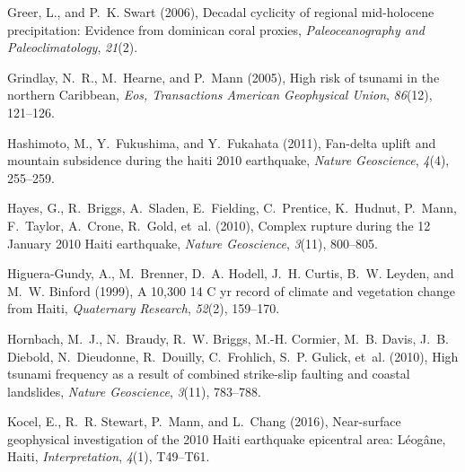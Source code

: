 \documentclass[linenumbers,draft]{agujournal}
\begin{document}
\begin{thebibliography}{62}
Greer, L., and P.~K. Swart (2006), Decadal cyclicity of regional mid-holocene
  precipitation: Evidence from dominican coral proxies,
  \textit{Paleoceanography and Paleoclimatology}, \textit{21}(2).

Grindlay, N.~R., M.~Hearne, and P.~Mann (2005), {High risk of tsunami in the
  northern Caribbean}, \textit{Eos, Transactions American Geophysical Union},
  \textit{86}(12), 121--126.

Hashimoto, M., Y.~Fukushima, and Y.~Fukahata (2011), Fan-delta uplift and
  mountain subsidence during the haiti 2010 earthquake, \textit{Nature
  Geoscience}, \textit{4}(4), 255--259.

Hayes, G., R.~Briggs, A.~Sladen, E.~Fielding, C.~Prentice, K.~Hudnut, P.~Mann,
  F.~Taylor, A.~Crone, R.~Gold, et~al. (2010), Complex rupture during the 12
  {January 2010 Haiti} earthquake, \textit{Nature Geoscience}, \textit{3}(11),
  800--805.

Higuera-Gundy, A., M.~Brenner, D.~A. Hodell, J.~H. Curtis, B.~W. Leyden, and
  M.~W. Binford (1999), A 10,300 14 {C yr record of climate and vegetation
  change from Haiti}, \textit{Quaternary Research}, \textit{52}(2), 159--170.

Hornbach, M.~J., N.~Braudy, R.~W. Briggs, M.-H. Cormier, M.~B. Davis, J.~B.
  Diebold, N.~Dieudonne, R.~Douilly, C.~Frohlich, S.~P. Gulick, et~al. (2010),
  High tsunami frequency as a result of combined strike-slip faulting and
  coastal landslides, \textit{Nature Geoscience}, \textit{3}(11), 783--788.

Kocel, E., R.~R. Stewart, P.~Mann, and L.~Chang (2016), {Near-surface
  geophysical investigation of the 2010 Haiti earthquake epicentral area:
  L{\'e}og{\^a}ne, Haiti}, \textit{Interpretation}, \textit{4}(1), T49--T61.


\end{thebibliography}
\end{document}

